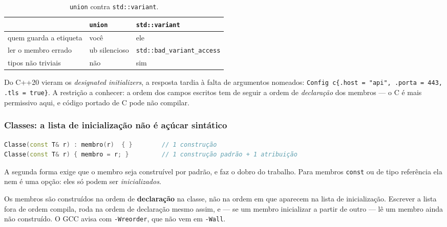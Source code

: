 \begin{table}[htbp]
\centering
\caption{\texttt{union} contra \texttt{std::variant}.}
\label{tab:union}
\footnotesize
\begin{tabular}{@{}lll@{}}
\toprule
 & \texttt{union} & \texttt{std::variant} \\
\midrule
quem guarda a etiqueta   & você                & ele \\
ler o membro errado      & \gls{ub} silencioso & \texttt{std::bad\_variant\_access} \\
tipos não triviais       & não                 & sim \\
\bottomrule
\end{tabular}
\end{table}

Do C++20 vieram os \emph{designated initializers}, a resposta tardia à falta de
argumentos nomeados: \texttt{Config c\{.host = "api", .porta = 443, .tls =
true\}}. A restrição a conhecer: a ordem dos campos escritos tem de seguir a
ordem de \emph{declaração} dos membros --- o C é mais permissivo aqui, e código
portado de C pode não compilar.

\subsubsection{Classes: a lista de inicialização não é açúcar sintático}

\begin{lstlisting}[style=bt, language=C++,
    caption={Inicializar e atribuir não são a mesma coisa.}]
Classe(const T& r) : membro(r)  { }        // 1 construção
Classe(const T& r) { membro = r; }         // 1 construção padrão + 1 atribuição
\end{lstlisting}

A segunda forma exige que o membro seja construível por padrão, e faz o dobro
do trabalho. Para membros \texttt{const} ou de tipo referência ela nem é uma
opção: eles só podem ser \emph{inicializados}.

\begin{armadilha}
Os membros são construídos na ordem de \textbf{declaração} na classe, não na
ordem em que aparecem na lista de inicialização. Escrever a lista fora de ordem
compila, roda na ordem de declaração mesmo assim, e --- se um membro
inicializar a partir de outro --- lê um membro ainda não construído. O GCC
avisa com \texttt{-Wreorder}, que não vem em \texttt{-Wall}.
\end{armadilha}


